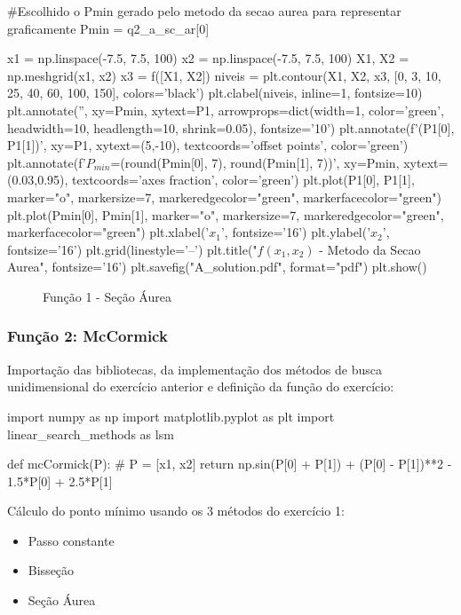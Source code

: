 \documentclass[10pt, a4paper]{article}
\begin{document}
\begin{python}
  #Escolhido o Pmin gerado pelo metodo da secao aurea para representar graficamente
  Pmin = q2_a_sc_ar[0]

  x1 = np.linspace(-7.5, 7.5, 100)
  x2 = np.linspace(-7.5, 7.5, 100)
  X1, X2 = np.meshgrid(x1, x2)
  x3 = f([X1, X2])
  niveis = plt.contour(X1, X2, x3, [0, 3, 10, 25, 40, 60, 100, 150], colors='black')
  plt.clabel(niveis, inline=1, fontsize=10)
  plt.annotate('', xy=Pmin, xytext=P1,
                  arrowprops=dict(width=1, color='green', headwidth=10, headlength=10, shrink=0.05), fontsize='10')
  plt.annotate(f'({P1[0]}, {P1[1]})', xy=P1, xytext=(5,-10), textcoords='offset points', color='green')
  plt.annotate(f'$P_{{min}}$=({round(Pmin[0], 7)}, {round(Pmin[1], 7)})', xy=Pmin, xytext=(0.03,0.95), textcoords='axes fraction', color='green')
  plt.plot(P1[0], P1[1], marker="o", markersize=7, markeredgecolor="green", markerfacecolor="green")
  plt.plot(Pmin[0], Pmin[1], marker="o", markersize=7, markeredgecolor="green", markerfacecolor="green")
  plt.xlabel('$x_1$', fontsize='16')
  plt.ylabel('$x_2$', fontsize='16')
  plt.grid(linestyle='--')
  plt.title("$f(x_1, x_2)$ - Metodo da Secao Aurea", fontsize='16')
  plt.savefig("A_solution.pdf", format="pdf")
  plt.show()
\end{python}

\begin{figure}[htpb]
  \centering
  \caption{Função 1 - Seção Áurea}
  \label{fig:q2a}
\end{figure}
\subsubsection{Função 2: McCormick}

Importação das bibliotecas, da implementação dos métodos de busca unidimensional do exercício anterior e
definição da função do exercício:

\begin{python}
  import numpy as np
  import matplotlib.pyplot as plt
  import linear_search_methods as lsm

  def mcCormick(P):
    # P = [x1, x2]
    return np.sin(P[0] + P[1]) + (P[0] - P[1])**2 - 1.5*P[0] + 2.5*P[1]
\end{python}

  Cálculo do ponto mínimo usando os 3 métodos do exercício 1:

\begin{itemize}
  \item Passo constante
  \item Bisseção
  \item Seção Áurea
\end{itemize}
\end{document}
